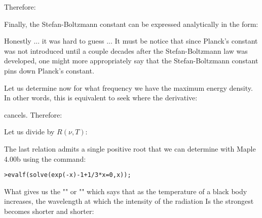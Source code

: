 	Therefore:
	
	Finally, the Stefan-Boltzmann constant can be expressed analytically in the form:
	
	Honestly ... it was hard to guess ... It must be notice that since Planck's constant was not introduced until a couple decades after the Stefan-Boltzmann law was developed, one might more appropriately say that the Stefan-Boltzmann constant pins down Planck's constant.

	Let us determine now for what frequency we have the maximum energy density. In other words, this is equivalent to seek where the derivative:
	
	cancels. Therefore:
	
	Let us divide by $R(\nu,T)$:
	
	The last relation admits a single positive root that we can determine with Maple 4.00b using the command:

	\texttt{>evalf(solve(exp(-x)-1+1/3*x=0,x));}
	
	
	What gives us the "" or "" which says that as the temperature of a black body increases, the wavelength at which the intensity of the radiation Is the strongest becomes shorter and shorter:
	

